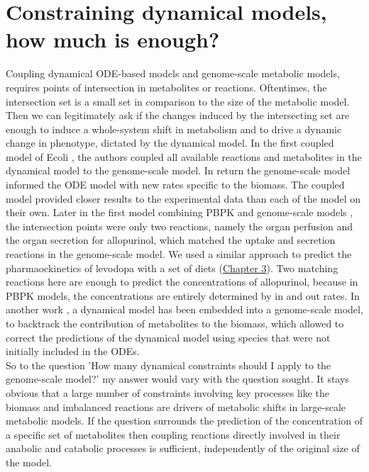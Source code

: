 \section{Constraining dynamical models, how much is enough?}
Coupling dynamical ODE-based models and genome-scale metabolic models, requires points of intersection in metabolites or reactions. Oftentimes, the intersection set is a small set in comparison to the size of the metabolic model. Then we can legitimately ask if the changes induced by the intersecting set are enough to induce a whole-system shift in metabolism and to drive a dynamic change in phenotype, dictated by the dynamical model. In the first coupled model of Ecoli \cite{covert2008integrating}, the authors coupled all available reactions and metabolites in the dynamical model to the genome-scale model. In return the genome-scale model informed the ODE model with new rates specific to the biomass. The coupled model provided closer results to the experimental data than each of the model on their own. Later in the first model combining PBPK and genome-scale models \cite{krauss2012integrating}, the intersection points were only two reactions, namely the organ perfusion and the organ secretion for allopurinol, which matched the uptake and secretion reactions in the genome-scale model. We used a similar approach to predict the pharmaockinetics of levodopa with a set of diets (\hyperref[ch:chapter3]{Chapter 3}). Two matching reactions here are enough to predict the concentrations of allopurinol, because in PBPK models, the concentrations are entirely determined by in and out rates. In another work \cite{tummler2015dynamic}, a dynamical model has been embedded into a genome-scale model, to backtrack the contribution of metabolites to the biomass, which allowed to correct the predictions of the dynamical model using species that were not initially included in the ODEs.\\
So to the question 'How many dynamical constraints should I apply to the genome-scale model?' my answer would vary with the question sought. It stays obvious that a large number of constraints involving key processes like the biomass and imbalanced reactions are drivers of metabolic shifts in large-scale metabolic models. If the question surrounds the prediction of the concentration of a specific set of metabolites then coupling reactions directly involved in their anabolic and catabolic processes is sufficient, independently of the original size of the model.\\
